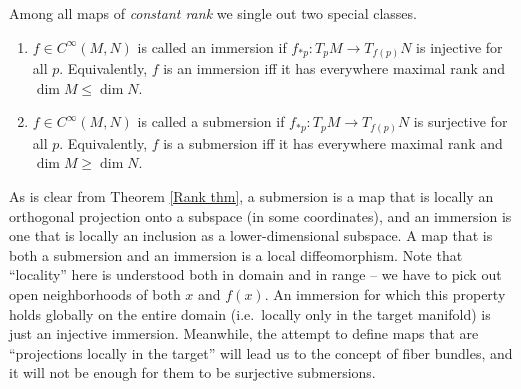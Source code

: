 \begin{defn}
Among all maps of \emph{constant rank} we single out two special classes.
\begin{enumerate}
    \item $f\in C^\infty(M,N)$ is called an immersion if $f_{\ast p}:T_p M\to T_{f(p)} N$ is injective for all $p$. Equivalently, $f$ is an immersion iff it has everywhere maximal rank and $\dim M\leq \dim N$.
    \item $f\in C^\infty(M,N)$ is called a submersion if $f_{\ast p}:T_p M\to T_{f(p)} N$ is surjective for all $p$. Equivalently, $f$ is a submersion iff it has everywhere maximal rank and $\dim M\geq \dim N$.
\end{enumerate}
\end{defn}

\begin{rem}
As is clear from Theorem \ref{Rank thm}, a submersion is a map that is locally an orthogonal projection onto a subspace (in some coordinates), and an immersion is one that is locally an inclusion as a lower-dimensional subspace. A map that is both a submersion and an immersion is a local diffeomorphism. Note that ``locality'' here is understood both in domain and in range -- we have to pick out open neighborhoods of both $x$ and $f(x)$. An immersion for which this property holds globally on the entire domain (i.e.~locally only in the target manifold) is just an injective immersion. Meanwhile, the attempt to define maps that are ``projections locally in the target'' will lead us to the concept of fiber bundles, and it will not be enough for them to be surjective submersions.
\end{rem}


